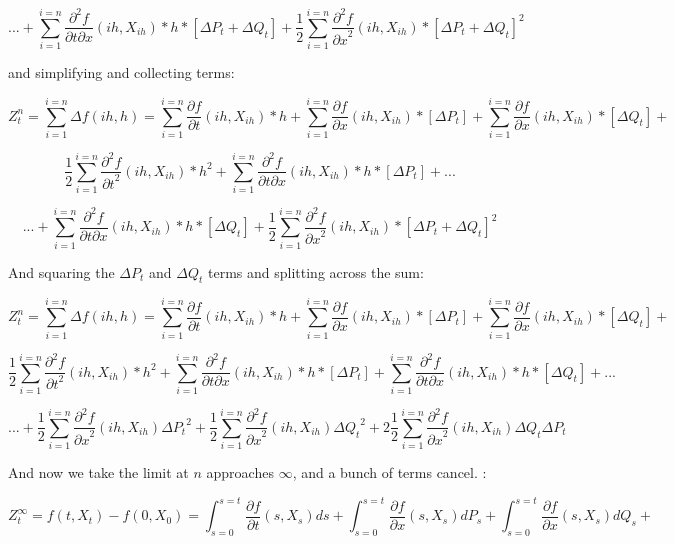 \documentclass{article}
\begin{document}
$$...   + \sum_{i=1}^{i = n} \frac{\partial^2 f}{\partial t \partial x}(ih,X_{ih}) *h*[\Delta P_t+ \Delta Q_t] + \frac{1}{2}\sum_{i=1}^{i = n}\frac{\partial^2 f}{{\partial x}^2}(ih,X_{ih}) * {[\Delta P_t+ \Delta Q_t]}^2$$

and simplifying and collecting terms:


$$Z_t^n = \sum_{i=1}^{i = n} \Delta f\left(ih,h\right) = \sum_{i=1}^{i = n} \frac{\partial f}{\partial t}(ih,X_{ih}) *h + \sum_{i=1}^{i = n}\frac{\partial f}{\partial x}(ih,X_{ih}) *[\Delta P_t] + \sum_{i=1}^{i = n}\frac{\partial f}{\partial x}(ih,X_{ih}) *[\Delta Q_t] +  $$


$$ \frac{1}{2}\sum_{i=1}^{i = n}\frac{\partial^2 f}{{\partial t}^2}(ih,X_{ih}) * {h}^2 + \sum_{i=1}^{i = n} \frac{\partial^2 f}{\partial t \partial x}(ih,X_{ih}) *h*[\Delta P_t] + ... $$



$$...   + \sum_{i=1}^{i = n} \frac{\partial^2 f}{\partial t \partial x}(ih,X_{ih}) *h*[ \Delta Q_t]+ \frac{1}{2}\sum_{i=1}^{i = n}\frac{\partial^2 f}{{\partial x}^2}(ih,X_{ih}) * {[\Delta P_t+ \Delta Q_t]}^2$$

And squaring the $\Delta P_t$ and $\Delta Q_t$ terms and splitting across the sum:



$$Z_t^n = \sum_{i=1}^{i = n} \Delta f\left(ih,h\right) = \sum_{i=1}^{i = n} \frac{\partial f}{\partial t}(ih,X_{ih}) *h + \sum_{i=1}^{i = n}\frac{\partial f}{\partial x}(ih,X_{ih}) *[\Delta P_t] + \sum_{i=1}^{i = n}\frac{\partial f}{\partial x}(ih,X_{ih}) *[\Delta Q_t] +  $$


$$ \frac{1}{2}\sum_{i=1}^{i = n}\frac{\partial^2 f}{{\partial t}^2}(ih,X_{ih}) * {h}^2 + \sum_{i=1}^{i = n} \frac{\partial^2 f}{\partial t \partial x}(ih,X_{ih}) *h*[\Delta P_t]  + \sum_{i=1}^{i = n} \frac{\partial^2 f}{\partial t \partial x}(ih,X_{ih}) *h*[ \Delta Q_t]+ ... $$



$$...  + \frac{1}{2}\sum_{i=1}^{i = n}\frac{\partial^2 f}{{\partial x}^2}(ih,X_{ih}) {\Delta P_t}^2 + \frac{1}{2}\sum_{i=1}^{i = n}\frac{\partial^2 f}{{\partial x}^2}(ih,X_{ih}){\Delta Q_t}^2 + 2\frac{1}{2}\sum_{i=1}^{i = n}\frac{\partial^2 f}{{\partial x}^2}(ih,X_{ih})\Delta Q_t \Delta P_t$$

And now we take the limit at $n$ approaches $\infty$, and a bunch of terms cancel. :


$$Z_t^\infty = f(t,X_t) - f(0,X_0) = \int_{s=0}^{s=t} \frac{\partial f}{\partial t}(s,X_s) ds + \int_{s=0}^{s=t}\frac{\partial f}{\partial x}(s,X_s) d P_s + \int_{s=0}^{s=t}\frac{\partial f}{\partial x}(s,X_s) d Q_s +  $$
\end{document}
